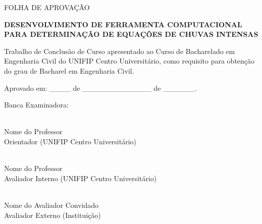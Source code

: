 	\thispagestyle{empty}
	
	\begin{center}
		FOLHA DE APROVAÇÃO
	\end{center}
	
	\vspace{2cm}
	
	\begin{center}
	\textbf{DESENVOLVIMENTO DE FERRAMENTA COMPUTACIONAL PARA DETERMINAÇÃO DE EQUAÇÕES DE CHUVAS INTENSAS}
	\end{center}
	
	\vspace{1.5cm}
	\onehalfspacing
	\noindent Trabalho de Conclusão de Curso apresentado ao Curso de Bacharelado em Engenharia Civil do UNIFIP Centro Universitário, como requisito para obtenção do grau de Bacharel em Engenharia Civil. 
	
	\vspace{10pt}
	
	\begin{center}
		Aprovado em: \_\_\_\_ de \_\_\_\_\_\_\_\_\_\_\_\_\_ de \_\_\_\_\_\_.
	\end{center}
	
	\vspace{10pt}
	
	\begin{center}
		Banca Examinadora:
	\end{center}
	
	\vspace{10pt}
	
	\begin{center}
		\hrulefill \\
		Nome do Professor\\
		Orientador (UNIFIP Centro Universitário)
	\end{center}
	
	\vspace{10pt}
	
	\begin{center}
		\hrulefill \\
		Nome do Professor \\
		Avaliador Interno (UNIFIP Centro Universitário)
	\end{center}
	
	\vspace{10pt}
	
	\begin{center}
		\hrulefill \\
		Nome do Avaliador Convidado\\
		Avaliador Externo (Instituição)
	\end{center}